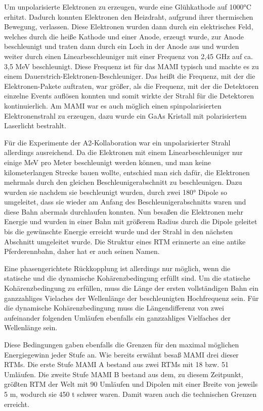 \documentclass[a4paper,11pt,oneside,final,german,openbib,pdftex]{scrbook}
\begin{document}
{Um unpolarisierte Elektronen zu erzeugen, wurde eine Glühkathode auf 1000°C erhitzt. Dadurch konnten Elektronen den Heizdraht, aufgrund ihrer thermischen Bewegung, verlassen. Diese Elektronen wurden dann durch ein elektrisches Feld, welches durch die heiße Kathode und einer Anode, erzeugt wurde, zur Anode beschleunigt und traten dann durch ein Loch in der Anode aus und wurden weiter durch einen Linearbeschleuniger mit einer Frequenz von 2,45 GHz auf ca. 3,5 MeV beschleunigt. Diese Frequenz ist für das MAMI typisch und machte es zu einem Dauerstrich-Elektronen-Beschleuniger. Das heißt die Frequenz, mit der die Elektronen-Pakete auftraten, war größer, als die Frequenz, mit der die Detektoren einzelne Events auflösen konnten und somit wirkte der Strahl für die Detektoren kontinuierlich.
Am MAMI war es auch m\"oglich einen spinpolarisierten Elektronenstrahl zu erzeugen, dazu wurde ein GaAs Kristall mit polarisiertem Laserlicht bestrahlt. 

F\"ur die Experimente der A2-Kollaboration war ein unpolarisierter Strahl allerdings ausreichend.
\newline
Da die Elektronen mit einem Linearbeschleuniger nur einige MeV pro Meter beschleunigt werden k\"onnen, und man keine kilometerlangen Strecke bauen wollte, entschied man sich daf\"ur, die Elektronen mehrmals durch den gleichen Beschleunigerabschnitt zu beschleunigen. Dazu wurden sie nachdem sie beschleunigt wurden, durch zwei 180° Dipole so umgeleitet, dass sie wieder am Anfang des Beschleunigerabschnitts waren und diese Bahn abermals durchlaufen konnten. Nun besa{\ss}en die Elektronen mehr Energie und wurden in einer Bahn mit gr\"o{\ss}erem Radius durch die Dipole geleitet bis die gew\"unschte Energie erreicht wurde und der Strahl in den n\"achsten Abschnitt umgeleitet wurde. Die Struktur eines RTM erinnerte an eine antike Pferderennbahn, daher hat er auch seinen Namen.

 Eine phasengerichtete R\"uckkopplung ist allerdings nur m\"oglich, wenn die statische und die dynamische Koh\"arenzbedingung erf\"ullt sind. Um die statische Koh\"arenzbedingung zu erf\"ullen, muss die L\"ange der ersten vollst\"andigen Bahn ein ganzzahliges Vielaches der Wellenl\"ange der beschleunigten Hochfrequenz sein. F\"ur die dynamische Koh\"arenzbedingung muss die L\"angendifferenz von zwei aufeinander folgenden Uml\"aufen ebenfalls ein ganzzahliges Vielfaches der Wellenl\"ange sein\cite{Un08}. 
 
 Diese Bedingungen gaben ebenfalls die Grenzen f\"ur den maximal m\"oglichen Energiegewinn jeder Stufe an. 
\newline
Wie bereits erw\"ahnt besa{\ss} MAMI drei dieser RTMs. Die erste Stufe MAMI A bestand aus zwei RTMs mit 18 bzw. 51 Uml\"aufen. Die zweite Stufe MAMI B bestand aus dem, zu diesem Zeitpunkt, gr\"o{\ss}ten RTM der Welt mit 90 Uml\"aufen und Dipolen mit einer Breite von jeweils 5 m, wodurch sie 450 t schwer waren. Damit waren auch die technischen Grenzen erreicht.\cite{KPh11F}


}
\end{document}

